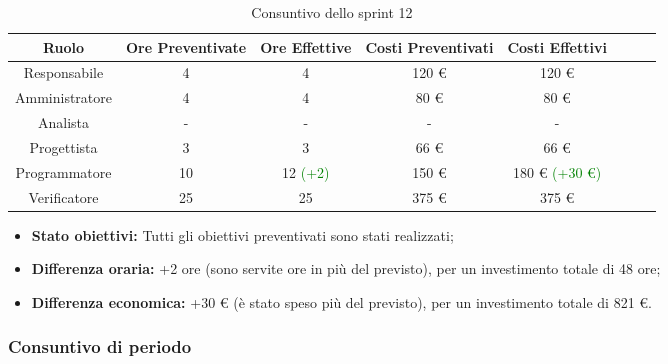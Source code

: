 \begin{table}[H]
		\begin{center}
			\setlength{\aboverulesep}{0pt}
			\setlength{\belowrulesep}{0pt}
			\setlength{\extrarowheight}{.75ex}
			\begin{tabular}{ c c c c c c c c }
				\rowcolor{AzzurroGruppo!30} 
				\textbf{Ruolo} & \textbf{Ore Preventivate} & \textbf{Ore Effettive} & \textbf{Costi Preventivati} & \textbf{Costi Effettivi}\\
				\toprule
				Responsabile   & 4 & 4 & 120 \euro{}  & 120 \euro{}\\
				Amministratore & 4 & 4 & 80 \euro{}  & 80 \euro{} \\
				Analista       & - & - & - & - \\
				Progettista    & 3 & 3 & 66 \euro{} & 66 \euro{} \\
				Programmatore  & 10 & 12 \textcolor{green}{(+2)} & 150 \euro{}  & 180 \euro{} \textcolor{green}{(+30 \euro{})} \\
				Verificatore   & 25 & 25 & 375 \euro{}  & 375 \euro{} \\
				\bottomrule
			\end{tabular}
			\caption{Consuntivo dello sprint 12}
		\end{center}
	\end{table}
	
\begin{itemize}
	\item \textbf{Stato obiettivi:} Tutti gli obiettivi preventivati sono stati realizzati;
	\item \textbf{Differenza oraria:} +2 ore (sono servite ore in più del previsto), per un investimento totale di 48 ore;
	\item \textbf{Differenza economica:} +30 \euro{} (è stato speso più del previsto), per un investimento totale di 821 \euro{}.
\end{itemize}


\subsubsection{Consuntivo di periodo}

